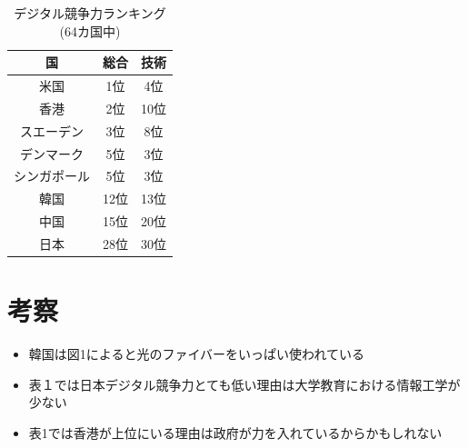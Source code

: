 \documentclass[a4paper,11pt,dvipdfmx]{ujarticle}
\begin{document}
\begin{table}[htbp]
    \centering
    \caption{デジタル競争力ランキング(64カ国中)}
    \begin{tabular}{|c|c|c|}
        \hline
        国 & 総合 & 技術 \\
        \hline
        米国 & 1位 & 4位 \\
        \hline
        香港 & 2位 & 10位 \\
        \hline
        スエーデン & 3位 & 8位 \\
        \hline
        デンマーク & 5位 & 3位 \\
        \hline
        シンガポール & 5位 & 3位 \\
        \hline
        \hline
        韓国 & 12位 & 13位 \\
        \hline
        中国 & 15位 & 20位 \\
        \hline
        \hline
        日本 & 28位 & 30位 \\
        \hline
    \end{tabular}
\end{table}

\section{考察}
\begin{itemize}
    \item 韓国は図1によると光のファイバーをいっぱい使われている
    \item 表１では日本デジタル競争力とても低い理由は大学教育における情報工学が少ない
    \item 表1では香港が上位にいる理由は政府が力を入れているからかもしれない
\end{itemize}




\end{document}
